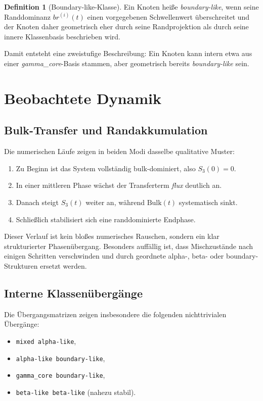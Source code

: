 \documentclass[11pt,a4paper]{article}
\theoremstyle{definition}
\newtheorem{definition}{Definition}
\theoremstyle{remark}
\begin{document}
	\begin{definition}[Boundary-like-Klasse]
		Ein Knoten heiße \emph{boundary-like}, wenn seine Randdominanz $br^{(i)}(t)$ einen vorgegebenen Schwellenwert überschreitet und der Knoten daher geometrisch eher durch seine Randprojektion als durch seine innere Klassenbasis beschrieben wird.
	\end{definition}
	
	Damit entsteht eine zweistufige Beschreibung: Ein Knoten kann intern etwa aus einer \emph{gamma\_core}-Basis stammen, aber geometrisch bereits \emph{boundary-like} sein.
	
	\section{Beobachtete Dynamik}
	\subsection{Bulk-Transfer und Randakkumulation}
	Die numerischen Läufe zeigen in beiden Modi dasselbe qualitative Muster:
	\begin{enumerate}[leftmargin=2em]
		\item Zu Beginn ist das System vollständig bulk-dominiert, also $S_3(0)=0$.
		\item In einer mittleren Phase wächst der Transferterm \emph{flux} deutlich an.
		\item Danach steigt $S_3(t)$ weiter an, während $\mathrm{Bulk}(t)$ systematisch sinkt.
		\item Schließlich stabilisiert sich eine randdominierte Endphase.
	\end{enumerate}
	
	Dieser Verlauf ist kein bloßes numerisches Rauschen, sondern ein klar strukturierter Phasenübergang. Besonders auffällig ist, dass Mischzustände nach einigen Schritten verschwinden und durch geordnete alpha-, beta- oder boundary-Strukturen ersetzt werden.
	
	\subsection{Interne Klassenübergänge}
	Die Übergangsmatrizen zeigen insbesondere die folgenden nichttrivialen Übergänge:
	\begin{itemize}[leftmargin=2em]
		\item \texttt{mixed \textrightarrow alpha-like},
		\item \texttt{alpha-like \textrightarrow boundary-like},
		\item \texttt{gamma\_core \textrightarrow boundary-like},
		\item \texttt{beta-like \textrightarrow beta-like} (nahezu stabil).
	\end{itemize}
	
\end{document}
